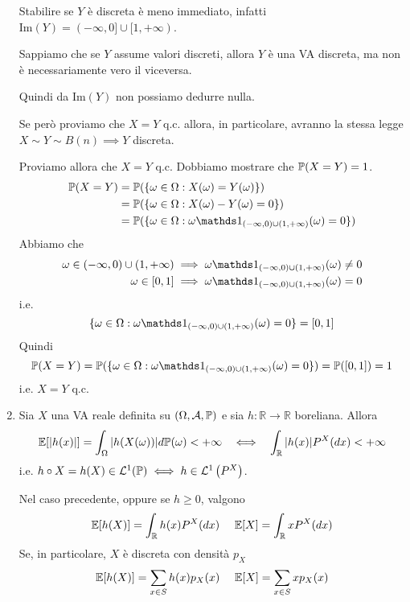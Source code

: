\begin{enumerate}
Stabilire se $Y$ è discreta è meno immediato, infatti $\mathrm{Im}( Y) =( -\infty ,0] \cup [ 1,+\infty )$.

\begin{oss}
Sappiamo che se $Y$ assume valori discreti, allora $Y$ è una VA discreta, ma non è necessariamente vero il viceversa.
\end{oss}

Quindi da $\mathrm{Im}( Y)$ non possiamo dedurre nulla.

Se però proviamo che $X=Y$ q.c. allora, in particolare, avranno la stessa legge $X\sim Y\sim B( n) \implies Y$ discreta.

Proviamo allora che $X=Y$ q.c. Dobbiamo mostrare che $\mathbb{P}( X=Y) =1$.
\begin{align*}
\PP( X=Y) & =\PP(\{\omega \in \Omega :X( \omega ) =Y( \omega )\})\\
 & =\PP(\{\omega \in \Omega :X( \omega ) -Y( \omega ) =0\})\\
 & =\PP(\{\omega \in \Omega :\omega \Ind_{( -\infty ,0) \cup ( 1,+\infty )}( \omega ) =0\})
\end{align*}
Abbiamo che
\begin{align*}
\omega \in ( -\infty ,0) \cup ( 1,+\infty ) & \implies \omega \Ind_{( -\infty ,0) \cup ( 1,+\infty )}( \omega ) \neq 0\\
\omega \in [ 0,1] & \implies \omega \Ind_{( -\infty ,0) \cup ( 1,+\infty )}( \omega ) =0
\end{align*}
i.e.
\begin{equation*}
\{\omega \in \Omega :\omega \Ind_{( -\infty ,0) \cup ( 1,+\infty )}( \omega ) =0\} =[ 0,1]
\end{equation*}
Quindi
\begin{equation*}
\PP( X=Y) =\PP(\{\omega \in \Omega :\omega \Ind_{( -\infty ,0) \cup ( 1,+\infty )}( \omega ) =0\}) =\PP([ 0,1]) =1
\end{equation*}
i.e. $X=Y$ q.c.
\item
\begin{theorem}
Sia $X$ una VA reale definita su $( \Omega ,\mathcal{A} ,\mathbb{P})$ e sia $h:\mathbb{R}\rightarrow \mathbb{R}$ boreliana. Allora
\begin{equation*}
\EE[| h( x)| ] =\int _{\Omega }| h( X( \omega ))| d\PP( \omega ) < +\infty \ \ \iff \ \ \int _{\mathbb{R}}| h( x)| P^{X}( dx) < +\infty 
\end{equation*}
i.e. $h\circ X=h( X) \in \mathcal{L}^{1}(\mathbb{P}) \iff h\in \mathcal{L}^{1}\left( P^{X}\right)$.

Nel caso precedente, oppure se $h\geq 0$, valgono
\begin{equation*}
\mathbb{E}[ h( X)] =\int _{\mathbb{R}} h( x) P^{X}( dx) \ \ \ \ \mathbb{E}[ X] =\int _{\mathbb{R}} xP^{X}( dx)
\end{equation*}
Se, in particolare, $X$ è discreta con densità $p_{X}$
\begin{equation*}
\mathbb{E}[ h( X)] =\sum\limits _{x\in S} h( x) p_{X}( x) \ \ \ \ \mathbb{E}[ X] =\sum\limits _{x\in S} xp_{X}( x)
\end{equation*}
\end{theorem}


\end{enumerate}
